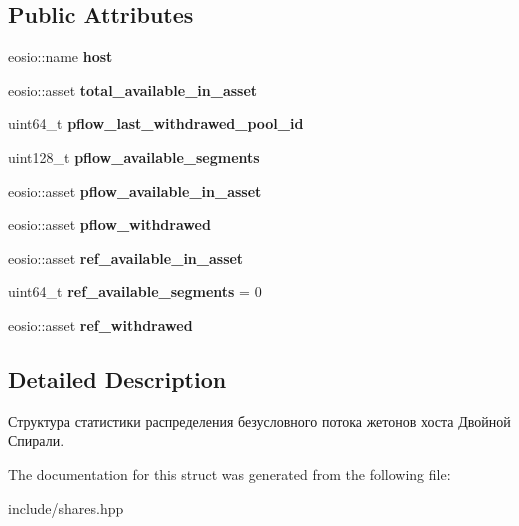 \subsection*{Public Attributes}
\begin{DoxyCompactItemize}
\item 
\mbox{\label{structpstats_ab4cf368b746c511fcd22ca33f96126c7}} 
eosio\+::name {\bfseries host}
\item 
\mbox{\label{structpstats_a75e7a460cbd3bb65d4dd20c8448f612f}} 
eosio\+::asset {\bfseries total\+\_\+available\+\_\+in\+\_\+asset}
\item 
\mbox{\label{structpstats_a3de2abae9166d7a70adde273169890e0}} 
uint64\+\_\+t {\bfseries pflow\+\_\+last\+\_\+withdrawed\+\_\+pool\+\_\+id}
\item 
\mbox{\label{structpstats_a3f5ad972e496774a7d0c46be6e5148f0}} 
uint128\+\_\+t {\bfseries pflow\+\_\+available\+\_\+segments}
\item 
\mbox{\label{structpstats_aa43e842556a658e53e6a69f26c230cf4}} 
eosio\+::asset {\bfseries pflow\+\_\+available\+\_\+in\+\_\+asset}
\item 
\mbox{\label{structpstats_a8ade8604d05f157631139dc455766572}} 
eosio\+::asset {\bfseries pflow\+\_\+withdrawed}
\item 
\mbox{\label{structpstats_a917e1e83e48f79abec8c040e4e07a83a}} 
eosio\+::asset {\bfseries ref\+\_\+available\+\_\+in\+\_\+asset}
\item 
\mbox{\label{structpstats_aa58b0a4588cd02e7360bf21bdd5340e4}} 
uint64\+\_\+t {\bfseries ref\+\_\+available\+\_\+segments} = 0
\item 
\mbox{\label{structpstats_af3c5983d5ed3389982e516d84c84eaa1}} 
eosio\+::asset {\bfseries ref\+\_\+withdrawed}
\end{DoxyCompactItemize}


\subsection{Detailed Description}
Структура статистики распределения безусловного потока жетонов хоста Двойной Спирали. 

The documentation for this struct was generated from the following file\+:\begin{DoxyCompactItemize}
\item 
include/shares.\+hpp\end{DoxyCompactItemize}
